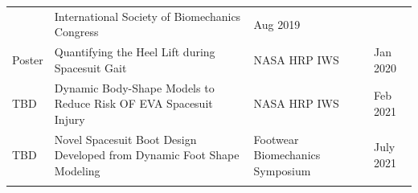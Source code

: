 \documentclass[defaultstyle,11pt]{comps}
\begin{document}
\begin{longtable}[]{@{}llll@{}}
\begin{minipage}[t]{0.22\columnwidth}
\end{minipage} & \begin{minipage}[t]{0.22\columnwidth}\raggedright
International Society of Biomechanics Congress\strut
\end{minipage} & \begin{minipage}[t]{0.22\columnwidth}\raggedright
Aug 2019\strut
\end{minipage}\tabularnewline
\begin{minipage}[t]{0.22\columnwidth}\raggedright
Poster\strut
\end{minipage} & \begin{minipage}[t]{0.22\columnwidth}\raggedright
Quantifying the Heel Lift during Spacesuit Gait\strut
\end{minipage} & \begin{minipage}[t]{0.22\columnwidth}\raggedright
NASA HRP IWS\strut
\end{minipage} & \begin{minipage}[t]{0.22\columnwidth}\raggedright
Jan 2020\strut
\end{minipage}\tabularnewline
\begin{minipage}[t]{0.22\columnwidth}\raggedright
TBD\strut
\end{minipage} & \begin{minipage}[t]{0.22\columnwidth}\raggedright
Dynamic Body-Shape Models to Reduce Risk OF EVA Spacesuit Injury\strut
\end{minipage} & \begin{minipage}[t]{0.22\columnwidth}\raggedright
NASA HRP IWS\strut
\end{minipage} & \begin{minipage}[t]{0.22\columnwidth}\raggedright
Feb 2021\strut
\end{minipage}\tabularnewline
\begin{minipage}[t]{0.22\columnwidth}\raggedright
TBD\strut
\end{minipage} & \begin{minipage}[t]{0.22\columnwidth}\raggedright
Novel Spacesuit Boot Design Developed from Dynamic Foot Shape Modeling\strut
\end{minipage} & \begin{minipage}[t]{0.22\columnwidth}\raggedright
Footwear Biomechanics Symposium\strut
\end{minipage} & \begin{minipage}[t]{0.22\columnwidth}\raggedright
July 2021\strut
\end{minipage}\tabularnewline
\begin{minipage}[t]{0.22\columnwidth}\raggedright

\end{minipage}
\end{longtable}
\end{document}

